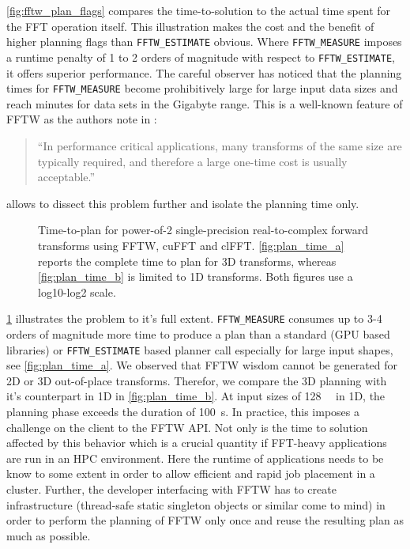 \cref{fig:fftw_plan_flags} compares the time-to-solution to the actual time spent for the FFT operation itself. This illustration makes the cost and the benefit of higher planning flags than \texttt{FFTW\_ESTIMATE} obvious. Where \texttt{FFTW\_MEASURE} imposes a runtime penalty of 1 to 2 orders of magnitude with respect to \texttt{FFTW\_ESTIMATE}, it offers superior performance. The careful observer has noticed that the planning times for \texttt{FFTW\_MEASURE} become prohibitively large for large input data sizes and reach minutes for data sets in the Gigabyte range. This is a well-known feature of FFTW as the authors note in \cite{FFTW05}:
%
\begin{quote}
  ``In performance critical applications, many transforms of the same
  size are typically required, and therefore a large one-time cost is
  usually acceptable.''
\end{quote}
% 
\gearshifft{} allows to dissect this problem further and isolate the planning time only.
%
\begin{figure}[!tbp]
  \centering
  \hfill
  \caption{Time-to-plan for power-of-2 single-precision real-to-complex forward transforms using FFTW, cuFFT and clFFT. \cref{fig:plan_time_a} reports the complete time to plan for 3D transforms, whereas \cref{fig:plan_time_b} is limited to 1D transforms. Both figures use a log10-log2 scale.}
  \label{fig:plan_time}
\end{figure}
%
\cref{fig:plan_time} illustrates the problem to it's full extent. \texttt{FFTW\_MEASURE} consumes up to 3-4 orders of magnitude more time to produce a plan than a standard (GPU based libraries) or \texttt{FFTW\_ESTIMATE} based planner call especially for large input shapes, see \cref{fig:plan_time_a}. We observed that FFTW wisdom cannot be generated for 2D or 3D out-of-place transforms. Therefor, we compare the 3D planning with it's counterpart in 1D in \cref{fig:plan_time_b}. At input sizes of \SI{128}{\mebi\byte} in 1D, the planning phase exceeds the duration of \SI{100}{\second}. In practice, this imposes a challenge on the client to the FFTW API. Not only is the time to solution affected by this behavior which is a crucial quantity if FFT-heavy applications are run in an HPC environment. Here the runtime of applications needs to be know to some extent in order to allow efficient and rapid job placement in a cluster. Further, the developer interfacing with FFTW has to create infrastructure (thread-safe static singleton objects or similar come to mind) in order to perform the planning of FFTW only once and reuse the resulting plan as much as possible.

